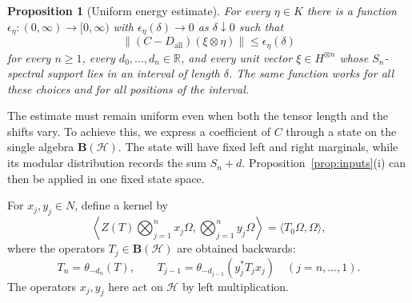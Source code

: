 \documentclass[11pt]{article}
\newtheorem{proposition}[theorem]{Proposition}
\theoremstyle{definition}
\newcommand{\R}{\mathbb R}
\newcommand{\HH}{\mathcal H}
\begin{document}
\begin{proposition}[Uniform energy estimate]\label{prop:energy}
For every $\eta\in K$ there is a function
$\epsilon_\eta:(0,\infty)\to[0,\infty)$ with
$\epsilon_\eta(\delta)\to0$ as $\delta\downarrow0$ such that
\begin{equation}\label{eq:energy}
 \|(C-D_{\mathrm{all}})(\xi\otimes\eta)\|
 \le\epsilon_\eta(\delta)
\end{equation}
for every $n\ge1$, every $d_0,\ldots,d_n\in\R$, and every unit vector
$\xi\in H^{\otimes n}$ whose $S_n$-spectral support lies in an interval of
length $\delta$. The same function works for all these choices and for all
positions of the interval.
\end{proposition}

The estimate must remain uniform even when both the tensor length and the
shifts vary. To achieve this, we express a coefficient of $C$ through a
state on the single algebra $\mathbf B(\HH)$. The state will have fixed
left and right marginals, while its modular distribution records the sum
$S_n+d$. Proposition~\ref{prop:inputs}(i) can then be applied in one fixed
state space.

For $x_j,y_j\in N$, define a kernel by
\begin{equation}\label{eq:Zkernel}
 \left\langle Z(T)\bigotimes_{j=1}^n x_j\Omega,
                  \bigotimes_{j=1}^n y_j\Omega\right\rangle
 =\langle T_0\Omega,\Omega\rangle,
\end{equation}
where the operators $T_j\in\mathbf B(\HH)$ are obtained backwards:
\[
 T_n=\theta_{-d_n}(T),\qquad
 T_{j-1}=\theta_{-d_{j-1}}(y_j^*T_jx_j)
 \quad(j=n,\ldots,1).
\]
The operators $x_j,y_j$ here act on $\HH$ by left multiplication.
\end{document}
